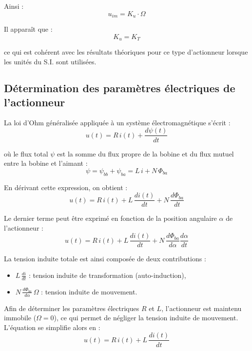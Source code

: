 Ainsi :
\begin{equation}
    u_{im} = K_u \cdot \Omega
\end{equation}

Il apparaît que :
\begin{equation}
\boxed{K_u = K_T}
\end{equation}

ce qui est cohérent avec les résultats théoriques pour ce type d’actionneur lorsque les unités du S.I. sont utilisées.
\newpage

\subsection{Détermination des paramètres électriques de l’actionneur}

La loi d’Ohm généralisée appliquée à un système électromagnétique s’écrit :
\begin{equation}
u(t) = R\,i(t) + \frac{d\psi(t)}{dt}
\end{equation}

où le flux total $\psi$ est la somme du flux propre de la bobine et du flux mutuel entre la bobine et l’aimant :
\begin{equation}
\psi = \psi_{bb} + \psi_{ba} = L\,i + N\,\Phi_{ba}
\end{equation}

En dérivant cette expression, on obtient :
\begin{equation}
u(t) = R\,i(t) + L\,\frac{di(t)}{dt} + N\,\frac{d\Phi_{ba}}{dt}
\end{equation}

Le dernier terme peut être exprimé en fonction de la position angulaire $\alpha$ de l’actionneur :
\begin{equation}
u(t) = R\,i(t) + L\,\frac{di(t)}{dt} + N\,\frac{d\Phi_{ba}}{d\alpha} \frac{d\alpha}{dt}
\end{equation}

La tension induite totale est ainsi composée de deux contributions :
\begin{itemize}
    \item $L\,\frac{di}{dt}$ : tension induite de transformation (auto-induction),
    \item $N\,\frac{d\Phi_{ba}}{d\alpha}\,\Omega$ : tension induite de mouvement.
\end{itemize}

Afin de déterminer les paramètres électriques $R$ et $L$, l’actionneur est maintenu immobile ($\Omega = 0$), ce qui permet de négliger la tension induite de mouvement. L’équation se simplifie alors en :
\begin{equation}
u(t) = R\,i(t) + L\,\frac{di(t)}{dt}
\end{equation}

